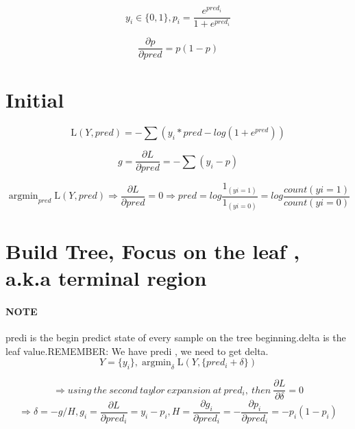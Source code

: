 \documentclass{article}
\begin{document}
 





\begin{equation}
{y_i}   \in  \{0,1\} ,  {p_i} =\frac{e^{pred_i}}{1+ e^{pred_i}}
\end{equation}



 
\begin{equation}
	\frac{\partial p}{\partial pred} = p(1-p)
\end{equation}

\section{Initial}
\begin{equation}
\mathrm{L}(Y,pred) = -\sum({y_i}*pred - log(1+ e^{pred}))
\end{equation}

\begin{equation}
g = \frac{\partial L}{\partial pred} = -\sum({y_i} - p)
\end{equation}

\begin{equation}
\mathop{\arg\min}_{pred} \mathrm{L} (Y, pred) \Rightarrow  \frac{\partial L}{\partial pred} = 0 \Rightarrow pred = log\frac{{1_(yi=1)}}{{1_(yi=0)}} = log\frac{count(yi=1)}{count(yi=0)}
\end{equation}

\section{Build Tree, Focus on the leaf , a.k.a terminal region}
\paragraph{NOTE}predi is the begin predict state of every sample on the tree beginning.delta is the leaf value.REMEMBER: We have predi , we need to get delta.
\begin{equation}
Y = \{{y_i}\}, \mathop{\arg\min}_{\delta} \mathrm{L} (Y, \{{pred_i} + {\delta}\})
\end{equation}
\newline 


\begin{equation}
\Rightarrow  using\  the\ second\ taylor\ expansion\ at\ {pred_i},\ then\ \frac{\partial L}{\partial {\delta}} = 0  
\end{equation}
\begin{equation}
\Rightarrow {\delta} = - g/H,   {g_i} = \frac{\partial L}{\partial {pred_i}} = {y_i} - {p_i},  H = \frac{\partial {g_i}}{\partial {pred_i}} = - \frac{\partial {p_i}}{\partial {pred_i}} = - {p_i}(1-{p_i})
\end{equation}
\end{document}
